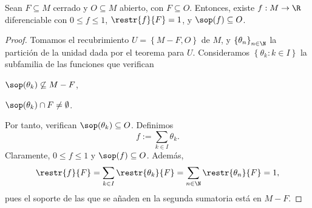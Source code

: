 \begin{ncor}
  Sean $F\subseteq M$ cerrado y $O\subseteq M$ abierto, con $F\subseteq
  O$. Entonces, existe $f: M\to \R$ diferenciable con $0\leq f \leq 1$,
  $\restr{f}{F} = 1$, y $\sop(f) \subseteq O$.
\end{ncor}
\begin{proof}
  Tomamos el recubrimiento $U = \left\{ M-F, O \right\}$ de $M$, y $\left\{
    \theta_{n} \right\}_{n\in\N}$ la partición de la unidad dada por el teorema
  para $U$. Consideramos $\left\{ \theta_{k} : k\in I \right\}$ la subfamilia de
  las funciones que verifican
  \begin{nlist}
  \item
    $\sop(\theta_{k})\not\subseteq M-F$,
  \item
    $\sop(\theta_{k})\cap F \ne \emptyset$.
  \end{nlist}
  Por tanto, verifican $\sop(\theta_{k})\subseteq O$. Definimos
  \[
    f := \sum_{k\in I} \theta_{k}
    .\]
  Claramente, $0\leq f \leq 1$ y $\sop(f)\subseteq O$. Además,
  \[
    \restr{f}{F} = \sum_{k\in I} \restr{\theta_{k}}{F} = \sum_{n\in\N} \restr{\theta_{n}}{F} = 1
    ,\]
  pues el soporte de las que se añaden en la segunda sumatoria está en $M-F$.
\end{proof}

